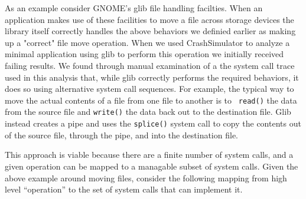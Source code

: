     As an example consider GNOME's glib file handling facilties.  When an application makes use of these facilities to move
    a file across storage devices the library itself correctly handles the above behaviors we definied earlier as making up
    a "correct" file move operation.  When we used CrashSimulator to analyze a minimal application using glib to perform
    this operation we initially received failing results.  We found through manual examination of a the system call trace
    used in this analysis that, while glib correctly performs the required behaviors, it does so using alternative system
    call sequences.  For example, the typical way to move the actual contents of a file from one file to another is to {\tt
      read()} the data from the source file and {\tt write()} the data back out to the destination file.  Glib instead
    creates a pipe and uses the {\tt splice()} system call to copy the contents out of the source file, through the pipe,
    and into the destination file.

    This approach is viable because there are a finite number of system calls, and a given operation can be mapped to a
    managable subset of system calls.  Given the above example around moving files, consider the following mapping from
    high level ``operation'' to the set of system calls that can implement it.

